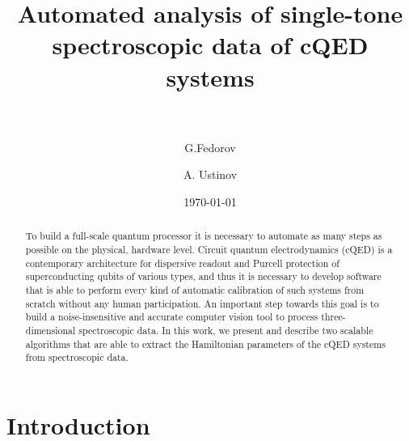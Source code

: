 \documentclass[%
 aip,
 draft,
 amsmath,amssymb,
 reprint,%
]{revtex4-1}
\begin{document}

\title[Automated analysis of single-tone spectroscopic data of cQED systems]{Automated analysis of single-tone spectroscopic data of cQED systems\\~}

\author{G.Fedorov}

%
%

\author{A. Ustinov}
%
%

\date{\today}%

\begin{abstract}
To build a full-scale quantum processor it is necessary to automate as many steps as possible on the physical, hardware level. Circuit quantum electrodynamics (cQED) is a contemporary architecture for dispersive readout and Purcell protection of superconducting qubits of various types, and thus it is necessary to develop software that is able to perform every kind of automatic calibration of such systems from scratch without any human participation. An important step towards this goal is to build a noise-insensitive and accurate computer vision tool to process three-dimensional spectroscopic data. In this work, we present and describe two scalable algorithms that are able to extract the Hamiltonian parameters of the cQED systems from spectroscopic data. 
\end{abstract}

\maketitle

 \renewcommand*{\figureautorefname}{Fig.}

\section{Introduction} \label{sec:level1} 
\end{document}
